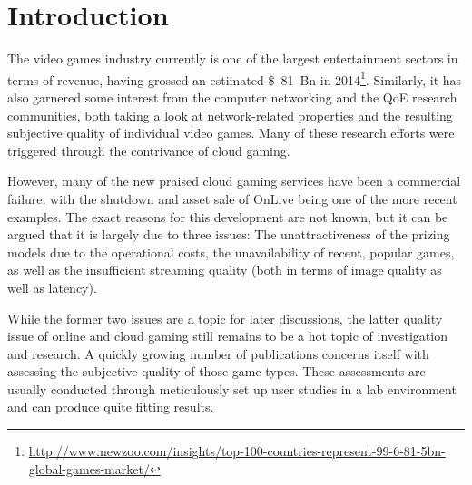 \section{Introduction}
\label{sec:introduction}


The video games industry currently is one of the largest entertainment sectors in terms of revenue, having grossed an estimated \SI{81}[\$]{Bn} in 2014\footnote{\url{http://www.newzoo.com/insights/top-100-countries-represent-99-6-81-5bn-global-games-market/}}. Similarly, it has also garnered some interest from the computer networking and the \gls{QoE} research communities, both taking a look at network-related properties and the resulting subjective quality of individual video games. Many of these research efforts were triggered through the contrivance of cloud gaming.


However, many of the new praised cloud gaming services have been a commercial failure, with the shutdown and asset sale of OnLive being one of the more recent examples. The exact reasons for this development are not known, but it can be argued that it is largely due to three issues: The unattractiveness of the prizing models due to the operational costs, the unavailability of recent, popular games, as well as the insufficient streaming quality (both in terms of image quality as well as latency).

While the former two issues are a topic for later discussions, the latter quality issue of online and cloud gaming still remains to be a hot topic of investigation and research. %
A quickly growing number of publications concerns itself with assessing the subjective quality of those game types. These assessments are usually conducted through meticulously set up user studies in a lab environment and can produce quite fitting results.


